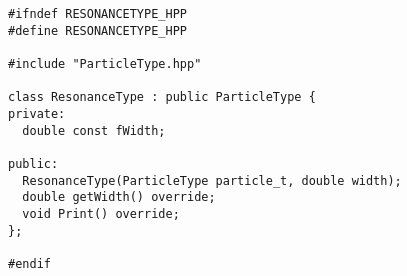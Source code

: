 \begin{lstlisting}
#ifndef RESONANCETYPE_HPP
#define RESONANCETYPE_HPP

#include "ParticleType.hpp"

class ResonanceType : public ParticleType {
private:
  double const fWidth;

public:
  ResonanceType(ParticleType particle_t, double width);
  double getWidth() override;
  void Print() override;
};

#endif
\end{lstlisting}
